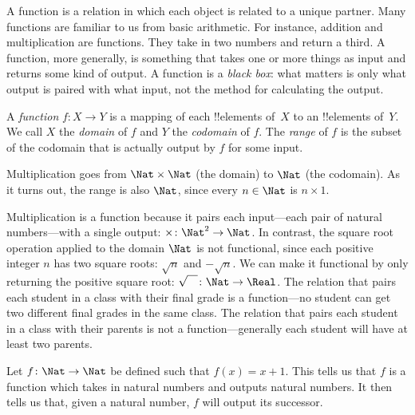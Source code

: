 \documentclass[../../include/open-logic-section]{subfiles}
\begin{document}

\begin{explain}
A function is a relation in which each object is related to a unique
partner. Many functions are familiar to us from basic arithmetic. For
instance, addition and multiplication are functions. They take in two
numbers and return a third. A function, more generally, is something
that takes one or more things as input and returns some kind of
output. A function is a \emph{black box}: what matters is only what
output is paired with what input, not the method for calculating the
output.
\end{explain}

\begin{defn}
A \emph{function} $f \colon X \to Y$ is a mapping of each !!{element}s
of~$X$ to an !!{element}s of~$Y$. We call $X$ the \emph{domain} of $f$
and $Y$ the \emph{codomain} of $f$. The \emph{range} of $f$ is the
subset of the codomain that is actually output by $f$ for some input.
\end{defn}

\begin{ex}
Multiplication goes from $\Nat \times \Nat$ (the domain) to $\Nat$
(the codomain). As it turns out, the range is also $\Nat$, since every
$n \in \Nat$ is $n \times 1$.
\end{ex}

\begin{explain}
Multiplication is a function because it pairs each input---each pair
of natural numbers---with a single output: $\times \colon \Nat^2 \to
\Nat$. In contrast, the square root operation applied to the domain
$\Nat$ is not functional, since each positive integer $n$ has two
square roots: $\sqrt{n}$ and $-\sqrt{n}$. We can make it functional by
only returning the positive square root: $\sqrt{\phantom{X}} \colon
\Nat \to \Real$. The relation that pairs each student in a class with
their final grade is a function---no student can get two different
final grades in the same class. The relation that pairs each student
in a class with their parents is not a function---generally each
student will have at least two parents.
\end{explain}

\begin{ex}
Let $f \colon \Nat \to \Nat$ be defined such that $f(x) = x+1$. This
tells us that $f$ is a function which takes in natural numbers and
outputs natural numbers. It then tells us that, given a natural
number, $f$ will output its successor.
\end{ex}
\end{document}
